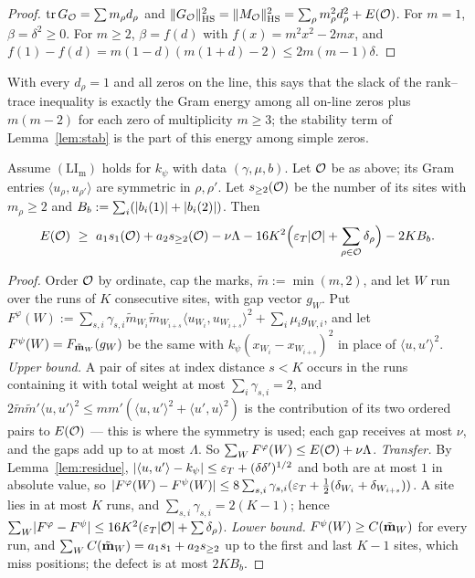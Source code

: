 \begin{proof}
$\operatorname{tr} G_\mathcal O=\sum m_\rho d_\rho$ and $\lVert G_\mathcal O\rVert_{\mathrm{HS}}^2=\lVert M_\mathcal O\rVert_{\mathrm{HS}}^2=\sum_\rho m_\rho^2d_\rho^2+E(\mathcal O)$. For $m=1$, $\beta=\delta^2\ge0$. For $m\ge2$,
$\beta=f(d)$ with $f(x)=m^2x^2-2mx$, and $f(1)-f(d)=m(1-d)(m(1+d)-2)\le2m(m-1)\delta$.
\end{proof}

With every $d_\rho=1$ and all zeros on the line, this says that the slack of the rank--trace inequality is exactly the Gram energy among all
on-line zeros plus $m(m-2)$ for each zero of multiplicity $m\ge3$; the stability term of Lemma~\ref{lem:stab} is the part of this energy
among simple zeros.

\begin{proposition}[Aggregation]\label{prop:agg}
Assume $(\mathrm{LI}_{\mathrm m})$ holds for $k_\psi$ with data $(\gamma,\mu,b)$. Let $\mathcal O$ be as above; its Gram entries
$\langle u_\rho,u_{\rho'}\rangle$ are symmetric in $\rho,\rho'$. Let $s_{\ge2}(\mathcal O)$ be the number of its sites with $m_\rho\ge2$ and
$B_b:=\sum_i(\lvert b_i(1)\rvert+\lvert b_i(2)\rvert)$. Then
\[
E(\cO)\ \ge\ a_1s_1(\cO)+a_2s_{\ge2}(\cO)-\nu\Lambda-16K^2\Big(\eps_T\abs\cO+\sum_{\rho\in\cO}\delta_\rho\Big)-2KB_b .
\]
\end{proposition}

\begin{proof}
Order $\mathcal O$ by ordinate, cap the marks, $\tilde m:=\min(m,2)$, and let $W$ run over the runs of $K$ consecutive sites, with gap vector $g_W$.
Put $F^\varphi(W):=\sum_{s,i}\gamma_{s,i}\tilde m_{W_i}\tilde m_{W_{i+s}}\langle u_{W_i},u_{W_{i+s}}\rangle^2+\sum_i\mu_ig_{W,i}$, and let
$F^\psi(W)=F_{\tilde{\mathbf m}_W}(g_W)$ be the same with $k_\psi(x_{W_i}-x_{W_{i+s}})^2$ in place of $\langle u,u'\rangle^2$.
\emph{Upper bound.} A pair of sites at index distance $s<K$ occurs in the runs containing it with total weight at most $\sum_i\gamma_{s,i}=2$, and
$2\tilde m\tilde m'\langle u,u'\rangle^2\le mm'(\langle u,u'\rangle^2+\langle u',u\rangle^2)$ is the contribution of its two ordered pairs to
$E(\mathcal O)$ --- this is where the symmetry is used; each gap receives at most $\nu$, and the gaps add up to at most $\Lambda$. So
$\sum_WF^\varphi(W)\le E(\mathcal O)+\nu\Lambda$.
\emph{Transfer.} By Lemma~\ref{lem:residue}, $\lvert \langle u,u'\rangle-k_\psi\rvert\le\varepsilon_T+(\delta\delta')^{1/2}$ and both are at most $1$ in absolute
value, so $\lvert F^\varphi(W)-F^\psi(W)\rvert\le8\sum_{s,i}\gamma_{s,i}(\varepsilon_T+\frac12(\delta_{W_i}+\delta_{W_{i+s}}))$. A site lies in at most $K$ runs,
and $\sum_{s,i}\gamma_{s,i}=2(K-1)$; hence $\sum_W\lvert F^\varphi-F^\psi\rvert\le16K^2(\varepsilon_T\lvert \mathcal O\rvert+\sum\delta_\rho)$.
\emph{Lower bound.} $F^\psi(W)\ge C(\tilde{\mathbf m}_W)$ for every run, and $\sum_WC(\tilde{\mathbf m}_W)=a_1s_1+a_2s_{\ge2}$ up to the first and last $K-1$
sites, which miss positions; the defect is at most $2KB_b$.
\end{proof}

